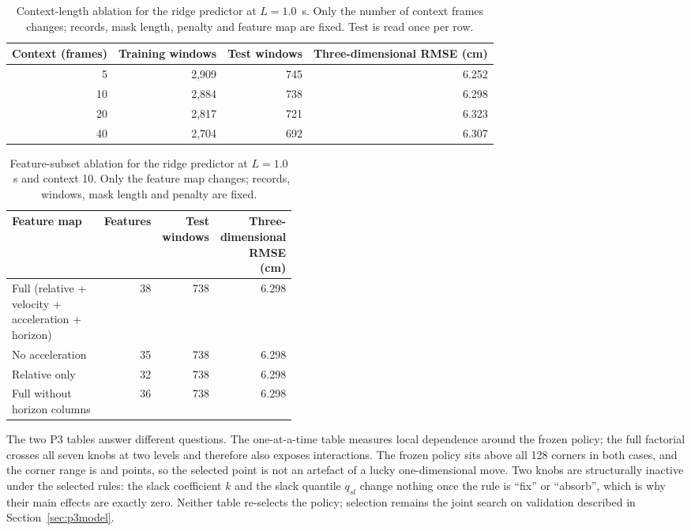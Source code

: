 \begin{table}[H]
\centering
\caption{Context-length ablation for the ridge predictor at $L=1.0$~s. Only the number of
context frames changes; records, mask length, penalty and feature map are fixed. Test is
read once per row.}
\label{tab:ctx-ablation}
\footnotesize
\begin{tabular}{rrrr}
\toprule
Context (frames) & Training windows & Test windows & Three-dimensional RMSE (cm) \\
\midrule
5 & 2,909 & 745 & 6.252 \\
10 & 2,884 & 738 & 6.298 \\
20 & 2,817 & 721 & 6.323 \\
40 & 2,704 & 692 & 6.307 \\
\bottomrule
\end{tabular}
\end{table}

\begin{table}[H]
\centering
\caption{Feature-subset ablation for the ridge predictor at $L=1.0$~s and context 10.
Only the feature map changes; records, windows, mask length and penalty are fixed.}
\label{tab:feature-ablation}
\scriptsize
\begin{tabular}{p{0.42\linewidth}rrr}
\toprule
Feature map & Features & Test windows & Three-dimensional RMSE (cm) \\
\midrule
Full (relative + velocity + acceleration + horizon) & 38 & 738 & 6.298 \\
No acceleration & 35 & 738 & 6.298 \\
Relative only & 32 & 738 & 6.298 \\
Full without horizon columns & 36 & 738 & 6.298 \\
\bottomrule
\end{tabular}
\end{table}

The two P3 tables answer different questions. The one-at-a-time table measures local
dependence around the frozen policy; the full factorial crosses all seven knobs at two
levels and therefore also exposes interactions. The frozen policy sits above all 128
corners in both cases, and the corner range is \slotPFactRangeSTwo{} and
\slotPFactRangeSThree{} points, so the selected point is not an artefact of a lucky
one-dimensional move. Two knobs are structurally inactive under the selected rules: the
slack coefficient $k$ and the slack quantile $q_{sl}$ change nothing once the rule is
``fix'' or ``absorb'', which is why their main effects are exactly zero. Neither table
re-selects the policy; selection remains the joint search on validation described in
Section~\ref{sec:p3model}.

